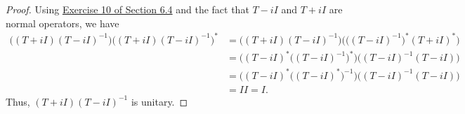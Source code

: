 \begin{proof}
Using {\hyperref[Exercise 6.4.10]{Exercise 10 of Section 6.4}} and the fact that \( T - iI  \) and \( T + iI  \) are normal operators, we have 
\begin{align*}
    \Big(  (T+iI)(T - iI)^{-1} \Big) \Big(  (T+iI)(T - iI)^{-1} \Big)^{*} &= \Big( (T+iI)(T-iI)^{-1}   \Big) \Big( \Big(  (T-iI)^{-1} \Big)^{*} (T + iI)^{*}   \Big) \\
                                                                          &= \Big(  (T - iI)^{*} \Big( (T - iI)^{-1} \Big)^{*} \Big) \Big( (T-iI)^{-1}  (T - iI) \Big) \\
                                                                          &= \Big(  (T - iI)^{*} \Big( (T - iI)^{*} \Big)^{-1} \Big) \Big( (T-iI)^{-1}  (T - iI) \Big) \\
                                                                          &= I I = I.
\end{align*}
Thus, \( (T+iI)(T - iI)^{-1} \) is unitary.
\end{proof}

